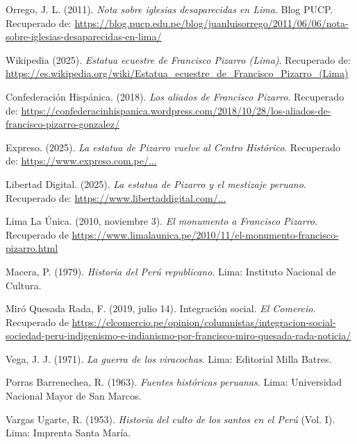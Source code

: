 \documentclass[a4paper,12pt]{article}
\begin{document}
	
	\begin{thebibliography}{9}
		Orrego, J. L. (2011). \textit{Nota sobre iglesias desaparecidas en Lima}. Blog PUCP. Recuperado de: \url{https://blog.pucp.edu.pe/blog/juanluisorrego/2011/06/06/nota-sobre-iglesias-desaparecidas-en-lima/}
		
		Wikipedia (2025). \textit{Estatua ecuestre de Francisco Pizarro (Lima)}. Recuperado de: \url{https://es.wikipedia.org/wiki/Estatua_ecuestre_de_Francisco_Pizarro_(Lima)}
		
		Confederación Hispánica. (2018). \textit{Los aliados de Francisco Pizarro}. Recuperado de: \url{https://confederacinhispanica.wordpress.com/2018/10/28/los-aliados-de-francisco-pizarro-gonzalez/}
		
		Expreso. (2025). \textit{La estatua de Pizarro vuelve al Centro Histórico}. Recuperado de: \url{https://www.expreso.com.pe/...}
		
		Libertad Digital. (2025). \textit{La estatua de Pizarro y el mestizaje peruano}. Recuperado de: \url{https://www.libertaddigital.com/...}
				
		Lima La Única. (2010, noviembre 3). \textit{El monumento a Francisco Pizarro}. Recuperado de \url{https://www.limalaunica.pe/2010/11/el-monumento-francisco-pizarro.html}
		
		Macera, P. (1979). \textit{Historia del Perú republicano}. Lima: Instituto Nacional de Cultura.
		
		Miró Quesada Rada, F. (2019, julio 14). Integración social. \textit{El Comercio}. Recuperado de \url{https://elcomercio.pe/opinion/columnistas/integracion-social-sociedad-peru-indigenismo-e-indianismo-por-francisco-miro-quesada-rada-noticia/}
		
		Vega, J. J. (1971). \textit{La guerra de los viracochas}. Lima: Editorial Milla Batres.
		
		Porras Barrenechea, R. (1963). \textit{Fuentes históricas peruanas}. Lima: Universidad Nacional Mayor de San Marcos.
		
		Vargas Ugarte, R. (1953). \textit{Historia del culto de los santos en el Perú} (Vol. I). Lima: Imprenta Santa María.
						
	
	\end{thebibliography}
	
	\appendix
	
\end{document}
